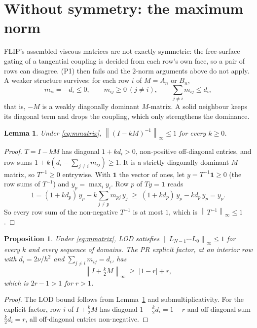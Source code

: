 \documentclass[11pt]{article}
\newtheorem{lemma}{Lemma}
\newtheorem{proposition}{Proposition}
\theoremstyle{remark}
\newcommand{\norm}[1]{\left\lVert #1 \right\rVert}
\newcommand{\Id}{I}
\begin{document}
\section{Without symmetry: the maximum norm}

FLIP's assembled viscous matrices are not exactly symmetric: the free-surface gating of a tangential coupling is decided from each row's own face, so a pair of rows can disagree. (P1) then fails and the $2$-norm arguments above do not apply. A weaker structure survives: for each row $i$ of $M = A_n$ or $B_n$,
\begin{equation}
  m_{ii} = -d_i \le 0, \qquad m_{ij} \ge 0 \ (j \ne i), \qquad \sum_{j \ne i} m_{ij} \le d_i ,
  \label{eq:mmatrix}
\end{equation}
that is, $-M$ is a weakly diagonally dominant $M$-matrix. A solid neighbour keeps its diagonal term and drops the coupling, which only strengthens the dominance.

\begin{lemma}\label{lem:maxnorm}
Under \eqref{eq:mmatrix}, $\norm{(\Id - kM)^{-1}}_\infty \le 1$ for every $k \ge 0$.
\end{lemma}
\begin{proof}
$T = \Id - kM$ has diagonal $1 + kd_i > 0$, non-positive off-diagonal entries, and row sums $1 + k(d_i - \sum_{j\ne i} m_{ij}) \ge 1$. It is a strictly diagonally dominant $M$-matrix, so $T^{-1} \ge 0$ entrywise. With $\mathbf{1}$ the vector of ones, let $y = T^{-1}\mathbf{1} \ge 0$ (the row sums of $T^{-1}$) and $y_p = \max_i y_i$. Row $p$ of $Ty = \mathbf{1}$ reads
\begin{equation}
  1 = (1 + kd_p)\, y_p - k\sum_{j\ne p} m_{pj}\, y_j \;\ge\; (1 + kd_p)\, y_p - k d_p\, y_p = y_p .
\end{equation}
So every row sum of the non-negative $T^{-1}$ is at most $1$, which is $\norm{T^{-1}}_\infty \le 1$.
\end{proof}

\begin{proposition}
Under \eqref{eq:mmatrix}, LOD satisfies $\norm{L_{N-1}\cdots L_0}_\infty \le 1$ for every $k$ and every sequence of domains. The PR explicit factor, at an interior row with $d_i = 2\nu/h^2$ and $\sum_{j\ne i} m_{ij} = d_i$, has
\begin{equation}
  \norm{\Id + \tfrac{k}{2}M}_\infty \;\ge\; \left|1 - r\right| + r ,
\end{equation}
which is $2r - 1 > 1$ for $r > 1$.
\end{proposition}
\begin{proof}
The LOD bound follows from Lemma~\ref{lem:maxnorm} and submultiplicativity. For the explicit factor, row $i$ of $\Id + \tfrac{k}{2}M$ has diagonal $1 - \tfrac{k}{2}d_i = 1 - r$ and off-diagonal sum $\tfrac{k}{2}d_i = r$, all off-diagonal entries non-negative.
\end{proof}
\end{document}
